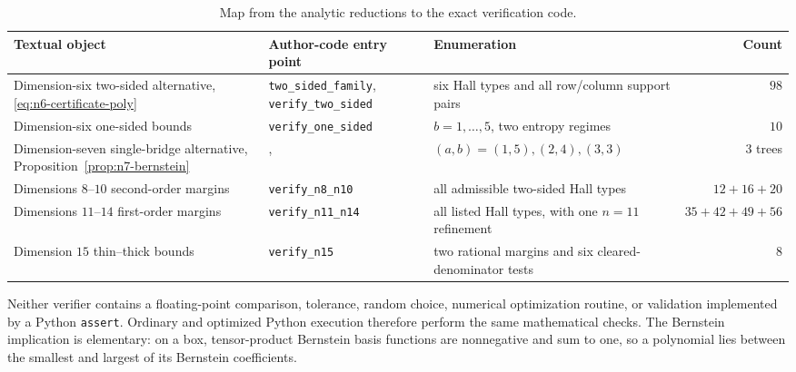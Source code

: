 \documentclass[11pt,a4paper]{article}
\numberwithin{equation}{section}
\theoremstyle{definition}
\newcommand{\1}{\mathbf{1}}
\begin{document}
\begin{table}[ht]
\centering
\small
\begin{tabularx}{\textwidth}{@{}Y Y Y r@{}}
\toprule
Textual object & Author-code entry point & Enumeration & Count \\
\midrule
Dimension-six two-sided alternative, \eqref{eq:n6-certificate-poly}
 & \texttt{two\_sided\_family}, \texttt{verify\_two\_sided}
 & six Hall types and all row/column support pairs & $98$ \\
Dimension-six one-sided bounds
 & \texttt{verify\_one\_sided}
 & $b=1,\ldots,5$, two entropy regimes & $10$ \\
Dimension-seven single-bridge alternative, Proposition~\ref{prop:n7-bernstein}
 & , 
 & $(a,b)=(1,5),(2,4),(3,3)$ & $3$ trees \\
Dimensions $8$--$10$ second-order margins
 & \texttt{verify\_n8\_n10}
 & all admissible two-sided Hall types & $12+16+20$ \\
Dimensions $11$--$14$ first-order margins
 & \texttt{verify\_n11\_n14}
 & all listed Hall types, with one $n=11$ refinement & $35+42+49+56$ \\
Dimension $15$ thin--thick bounds
 & \texttt{verify\_n15}
 & two rational margins and six cleared-denominator tests & $8$ \\
\bottomrule
\end{tabularx}
\caption{Map from the analytic reductions to the exact verification code.}
\label{tab:formula-code-map}
\end{table}

Neither verifier contains a floating-point comparison, tolerance, random
choice, numerical optimization routine, or validation implemented by a
Python \texttt{assert}.  Ordinary and optimized Python execution therefore
perform the same mathematical checks.  The Bernstein implication is
elementary: on a box, tensor-product Bernstein basis functions are
nonnegative and sum to one, so a polynomial lies between the smallest and
largest of its Bernstein coefficients.
\end{document}
